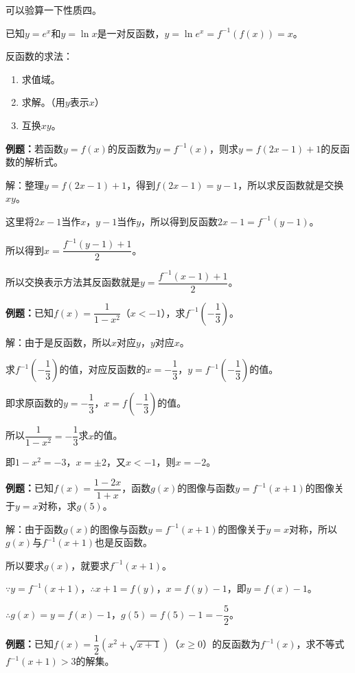 \documentclass[UTF8, 12pt]{ctexart}
\begin{document}
        可以验算一下性质四。

        已知$y=e^x$和$y=\ln x$是一对反函数，$y=\ln e^x=f^{-1}(f(x))=x$。

        反函数的求法：

        \begin{enumerate}
            \item 求值域。
            \item 求解。（用$y$表示$x$）
            \item 互换$xy$。
        \end{enumerate}

        \textbf{例题：}若函数$y=f(x)$的反函数为$y=f^{-1}(x)$，则求$y=f(2x-1)+1$的反函数的解析式。

        解：整理$y=f(2x-1)+1$，得到$f(2x-1)=y-1$，所以求反函数就是交换$xy$。

        这里将$2x-1$当作$x$，$y-1$当作$y$，所以得到反函数$2x-1=f^{-1}(y-1)$。

        所以得到$x=\dfrac{f^{-1}(y-1)+1}{2}$。

        所以交换表示方法其反函数就是$y=\dfrac{f^{-1}(x-1)+1}{2}$。

        \textbf{例题：}已知$f(x)=\dfrac{1}{1-x^2}$（$x<-1$），求$f^{-1}(-\dfrac{1}{3})$。

        解：由于是反函数，所以$x$对应$y$，$y$对应$x$。

        求$f^{-1}(-\dfrac{1}{3})$的值，对应反函数的$x=-\dfrac{1}{3}$，$y=f^{-1}(-\dfrac{1}{3})$的值。

        即求原函数的$y=-\dfrac{1}{3}$，$x=f(-\dfrac{1}{3})$的值。

        所以$\dfrac{1}{1-x^2}=-\dfrac{1}{3}$求$x$的值。

        即$1-x^2=-3$，$x=\pm2$，又$x<-1$，则$x=-2$。

        \textbf{例题：}已知$f(x)=\dfrac{1-2x}{1+x}$，函数$g(x)$的图像与函数$y=f^{-1}(x+1)$的图像关于$y=x$对称，求$g(5)$。

        解：由于函数$g(x)$的图像与函数$y=f^{-1}(x+1)$的图像关于$y=x$对称，所以$g(x)$与$f^{-1}(x+1)$也是反函数。

        所以要求$g(x)$，就要求$f^{-1}(x+1)$。

        $\because y=f^{-1}(x+1)$，$\therefore x+1=f(y)$，$x=f(y)-1$，即$y=f(x)-1$。

        $\therefore g(x)=y=f(x)-1$，$g(5)=f(5)-1=-\dfrac{5}{2}$。

        \textbf{例题：}已知$f(x)=\dfrac{1}{2}(x^2+\sqrt{x+1})$（$x\geqslant0$）的反函数为$f^{-1}(x)$，求不等式$f^{-1}(x+1)>3$的解集。
\end{document}
